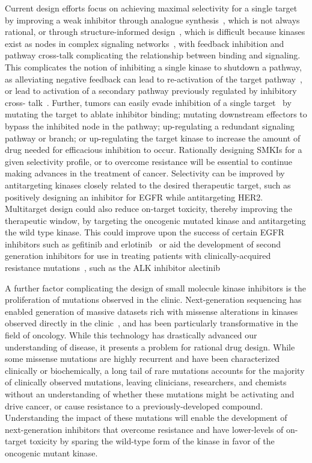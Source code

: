 \documentclass[phd,tocprelim]{cornell}
\begin{document}
Current design efforts focus on achieving maximal selectivity for a single target by improving a weak inhibitor through analogue synthesis~\citep{Zhang2009-il}, which is not always rational, or through structure-informed design~\citep{Zhang2009-il,Huggins2012-hr}, which is difficult because kinases exist as nodes in complex signaling networks~\citep{Mendoza2011-bj,Tricker2015-xx}, with feedback inhibition and pathway cross-talk complicating the relationship between binding and signaling. This complicates the notion of inhibiting a single kinase to shutdown a pathway, as alleviating negative feedback can lead to re-activation of the target pathway~\citep{Chandarlapaty2011-cq,Mendoza2011-bj}, or lead to activation of a secondary pathway previously regulated by inhibitory cross- talk~\citep{Mendoza2011-bj,Bailey2014-pd}. Further, tumors can easily evade inhibition of a single target~\citep{Knight:Nat.Rev.Cancer:2010} by mutating the target to ablate inhibitor binding; mutating downstream effectors to bypass the inhibited node in the pathway; up-regulating a redundant signaling pathway or branch; or up-regulating the target kinase to increase the amount of drug needed for efficacious inhibition to occur. Rationally designing SMKIs for a given selectivity profile, or to overcome resistance will be essential to continue making advances in the treatment of cancer. Selectivity can be improved by antitargeting kinases closely related to the desired therapeutic target, such as positively designing an inhibitor for EGFR while antitargeting HER2. Multitarget design could also reduce on-target toxicity, thereby improving the therapeutic window, by targeting the oncogenic mutated kinase and antitargeting the wild type kinase. This could improve upon the success of certain EGFR inhibitors such as gefitinib and erlotinib~\citep{Littlefield:Chem.Biol.:2014,Yun:2007jz,Gajiwala:2013bn} or aid the development of second generation inhibitors for use in treating patients with clinically-acquired resistance mutations~\citep{Jia:2016di,Drilon:2017gb,Politi:2015fg}, such as the ALK inhibitor alectinib~\citep{Song:2015gu}

A further factor complicating the design of small molecule kinase inhibitors is the proliferation of mutations observed in the clinic. Next-generation sequencing has enabled generation of massive datasets rich with missense alterations in kinases observed directly in the clinic~\citep{Varghese:2014jw,Zehir:2017ib,Garraway:2013kn}, and has been particularly transformative in the field of oncology. While this technology has drastically advanced our understanding of disease, it presents a problem for rational drug design.  While some missense mutations are highly recurrent and have been characterized clinically or biochemically, a long tail of rare mutations accounts for the majority of clinically observed mutations, leaving clinicians, researchers, and chemists without an understanding of whether these mutations might be activating and drive cancer, or cause resistance to a previously-developed compound. Understanding the impact of these mutations will enable the development of next-generation inhibitors that overcome resistance and have lower-levels of on-target toxicity by sparing the wild-type form of the kinase in favor of the oncogenic mutant kinase. 
\end{document}
